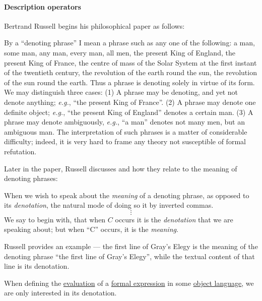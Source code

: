 \paragraph{Description operators}

\begin{concept}\label{con:denotation}
  Bertrand Russell begins his philosophical paper \cite{Russell1905OnDenoting} as follows:
  \begin{displayquote}
    By a \enquote{denoting phrase} I mean a phrase such as any one of the following: a man, some man, any man, every man, all men, the present King of England, the present King of France, the centre of mass of the Solar System at the first instant of the twentieth century, the revolution of the earth round the sun, the revolution of the sun round the earth. Thus a phrase is denoting solely in virtue of its form. We may distinguish three cases: (1) A phrase may be denoting, and yet not denote anything; \textit{e.g.}, \enquote{the present King of France}. (2) A phrase may denote one definite object; \textit{e.g.}, \enquote{the present King of England} denotes a certain man. (3) A phrase may denote ambiguously, \textit{e.g.}, \enquote{a man} denotes not many men, but an ambiguous man. The interpretation of such phrases is a matter of considerable difficulty; indeed, it is very hard to frame any theory not susceptible of formal refutation.
  \end{displayquote}

  Later in the paper, Russell discusses  and how they relate to the meaning of denoting phrases:
  \begin{displayquote}
    When we wish to speak about the \textit{meaning} of a denoting phrase, as opposed to its \textit{denotation}, the natural mode of doing so it by inverted commas.
    \begin{equation*}
      \vdots
    \end{equation*}
    We say to begin with, that when \( C \) occurs it is the \textit{denotation} that we are speaking about; but when \enquote{C} occurs, it is the \textit{meaning}.
  \end{displayquote}

  Russell provides an example --- the first line of Gray's Elegy is the meaning of the denoting phrase \enquote{the first line of Gray's Elegy}, while the textual content of that line is its denotation.

  When defining the \hyperref[con:evaluation]{evaluation} of a \hyperref[con:expression]{formal expression} in some \hyperref[con:metalanguage]{object language}, we are only interested in its denotation.
\end{concept}

